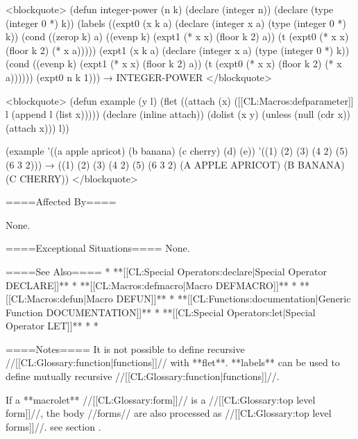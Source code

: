 <blockquote> (defun integer-power (n k) (declare (integer n)) (declare (type (integer 0 *) k)) (labels ((expt0 (x k a) (declare (integer x a) (type (integer 0 *) k)) (cond ((zerop k) a) ((evenp k) (expt1 (* x x) (floor k 2) a)) (t (expt0 (* x x) (floor k 2) (* x a))))) (expt1 (x k a) (declare (integer x a) (type (integer 0 *) k)) (cond ((evenp k) (expt1 (* x x) (floor k 2) a)) (t (expt0 (* x x) (floor k 2) (* x a)))))) (expt0 n k 1))) → INTEGER-POWER </blockquote>

<blockquote> (defun example (y l) (flet ((attach (x) ([[CL:Macros:defparameter]] l (append l (list x))))) (declare (inline attach)) (dolist (x y) (unless (null (cdr x)) (attach x))) l))

(example '((a apple apricot) (b banana) (c cherry) (d) (e)) '((1) (2) (3) (4 2) (5) (6 3 2))) → ((1) (2) (3) (4 2) (5) (6 3 2) (A APPLE APRICOT) (B BANANA) (C CHERRY)) </blockquote>

====Affected By====

None.

====Exceptional Situations====
None.

====See Also====
  * **[[CL:Special Operators:declare|Special Operator DECLARE]]**
  * **[[CL:Macros:defmacro|Macro DEFMACRO]]**
  * **[[CL:Macros:defun|Macro DEFUN]]**
  * **[[CL:Functions:documentation|Generic Function DOCUMENTATION]]**
  * **[[CL:Special Operators:let|Special Operator LET]]**
  * {\secref\Evaluation}
  * {\secref\DocVsDecls}

====Notes====
It is not possible to define recursive //[[CL:Glossary:function|functions]]// with **flet**. **labels** can be used to define mutually recursive //[[CL:Glossary:function|functions]]//.

If a **macrolet** //[[CL:Glossary:form]]// is a //[[CL:Glossary:top level form]]//, the body //forms// are also processed as //[[CL:Glossary:top level forms]]//. see section {\secref\FileCompilation}.

                
